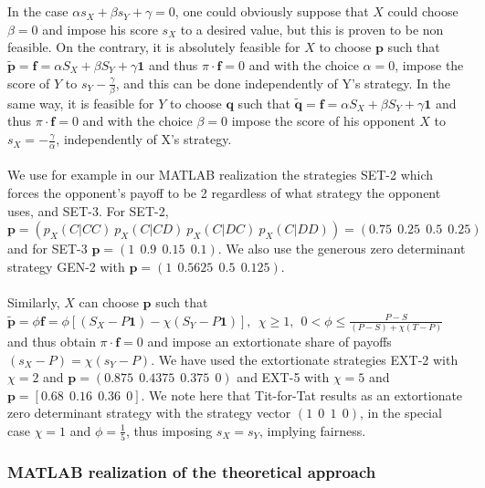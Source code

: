 \documentclass[12pt]{report}
\begin{document}
\\\\
In the case $\alpha s_X+\beta s_Y+\gamma=0$, one could obviously suppose that $X$ could
choose $\beta=0$ and impose his score $s_X$ to a desired value, but this is proven to be non feasible. On the contrary, it is absolutely feasible for $X$ to choose $\mathbf{p}$ such that $\tilde{\mathbf{p}}=\mathbf{f}=\alpha S_X+\beta S_Y+\gamma \mathbf{1}$ and thus $\pi \cdot \mathbf{f}=0$ and with the choice $\alpha=0$, impose the score of $Y$ to $s_Y-\frac{\gamma}{\beta}$, and this can be done independently of Y's strategy. In the same way, it is feasible for $Y$ to choose $\mathbf{q}$ such that $\tilde{\mathbf{q}}=\mathbf{f}=\alpha S_X+\beta S_Y+\gamma\mathbf{1}$ and thus $\pi \cdot \mathbf{f}=0$ and with the choice $\beta=0$ impose the score of his opponent $X$ to $s_X=-\frac{\gamma}{\alpha}$, independently of X's strategy.
\\\\
We use for example in our MATLAB realization the strategies SET-2 which forces the opponent's payoff to be 2 regardless of what strategy the opponent uses, and SET-3. For SET-2, $\mathbf{p}=(p_X(C|CC)\ p_X(C|CD)\ p_X(C|DC)\ p_X(C|DD))=(0.75\ \ 0.25\ \ 0.5\ \ 0.25)$ and for SET-3 $\mathbf{p}=(1\ \ 0.9\ \ 0.15 \ \ 0.1)$. We also use the generous zero determinant strategy GEN-2 with $\mathbf{p}=(1\ \ 0.5625\ \ 0.5\ \ 0.125)$.
\\\\
Similarly, $X$ can choose $\mathbf{p}$ such that $\tilde{\mathbf{p}}=\phi \mathbf{f}=\phi[(S_X-P\mathbf{1})-\chi(S_Y-P\mathbf{1})],\ \ \chi\ge1,\ \ 0< \phi\le \frac{P-S}{(P-S)+\chi(T-P)}$ and thus obtain $\pi \cdot \mathbf{f}=0$ and impose an extortionate share of payoffs $(s_X-P)=\chi(s_Y-P)$. We have used the extortionate strategies EXT-2 with $\chi=2$ and $\mathbf{p}=(0.875\ \ 0.4375\ \ 0.375 \ \ 0)$ and EXT-5 with $\chi=5$ and $\mathbf{p}=[0.68 \ \ 0.16\ \ 0.36\ \ 0]$. We note here that Tit-for-Tat results as an extortionate zero determinant strategy with the strategy vector $(1\ \ 0\ \ 1\ \ 0)$, in the special case $\chi=1$ and $\phi=\frac{1}{5}$, thus imposing $s_X=s_Y$, implying fairness.

\subsubsection{MATLAB realization of the theoretical approach}\label{MATLAB realization}
\end{document}
